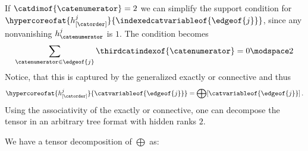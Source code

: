 \begin{example}\label{exa:cosetsCyclicTwoProduct} %
    If $\catdimof{\catenumerator}=2$ we can simplify the support condition for $\hypercoreofat{h^j_{[\catorder]}}{\indexedcatvariableof{\edgeof{j}}}$, since any nonvanishing $h^j_{\catenumerator}$ is $1$.
    The condition becomes
    \begin{align*}
        \sum_{\catenumerator\in\edgeof{j}} \thirdcatindexof{\catenumerator} = 0 \modspace 2
    \end{align*}
    Notice, that this is captured by the generalized exactly or connective and thus
    \begin{align*}
        \hypercoreofat{h^j_{[\catorder]}}{\catvariableof{\edgeof{j}}}
        = \bigoplus [\catvariableof{\edgeof{j}}] \, .
    \end{align*}
    Using the associativity of the exactly or connective, one can decompose the tensor in an arbitrary tree format with hidden ranks $2$.

    We have a tensor decomposition of $\bigoplus$ as:
\end{example}

